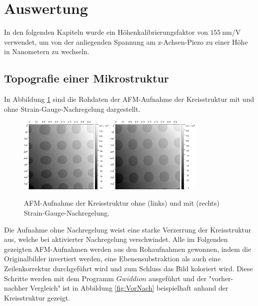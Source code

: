 \newpage
\section{Auswertung}
    In den folgenden Kapiteln wurde ein Höhenkalibrierungsfaktor von $\SI{155}{\nano\metre\per\volt}$ verwendet, um von der anliegenden Spannung am z-Achsen-Piezo zu einer Höhe in Nanometern zu wechseln.
    \subsection{Topografie einer Mikrostruktur}
    \label{sec:Mikro}
        In Abbildung \ref{fig:Strain} sind die Rohdaten der AFM-Aufnahme der Kreisstruktur mit und ohne Strain-Gauge-Nachregelung dargestellt.
        \begin{figure}
            \centering
            \includegraphics[width = 0.40\textwidth]{pictures/OhneStrain.png}
            \includegraphics[width = 0.40\textwidth]{pictures/Raw.png}
            \caption{AFM-Aufnahme der Kreisstruktur ohne (links) und mit (rechts) Strain-Gauge-Nachregelung.}
            \label{fig:Strain}    
        \end{figure}
        Die Aufnahme ohne Nachregelung weist eine starke Verzerrung der Kreisstruktur aus, welche bei aktivierter Nachregelung verschwindet.
        Alle im Folgenden gezeigten AFM-Aufnahmen werden aus den Rohaufnahmen gewonnen, indem die Originalbilder invertiert werden, eine Ebenensubstraktion als auch eine Zeilenkorrektur durchgeführt wird und zum Schluss das Bild koloriert wird. Diese Schritte werden mit dem Programm $\textit{Gwiddion}$ \cite{Gwyddion} ausgeführt und der "vorher-nachher Vergleich" ist in Abbildung \ref{fig:VorNach} beispielhaft anhand der Kreisstruktur gezeigt.

